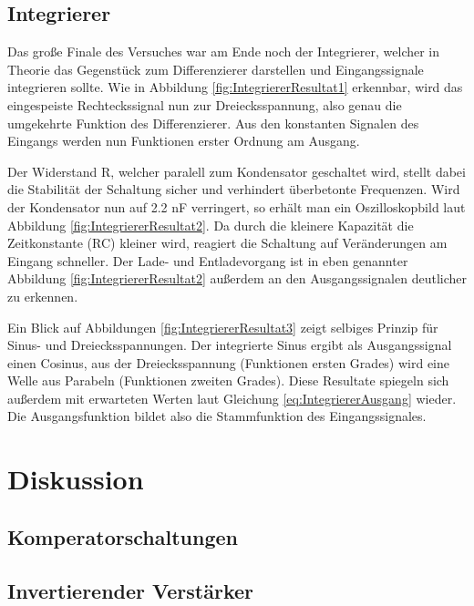 \documentclass[12pt,a4paper,twoside]{article}
\begin{document}
\subsection{Integrierer}

Das große Finale des Versuches war am Ende noch der Integrierer, welcher in Theorie das Gegenstück zum Differenzierer darstellen und Eingangssignale integrieren sollte. 
Wie in Abbildung \ref{fig:IntegriererResultat1} erkennbar, wird das eingespeiste Rechteckssignal nun zur Dreiecksspannung, also genau die umgekehrte Funktion des Differenzierer. Aus den konstanten Signalen des Eingangs werden nun Funktionen erster Ordnung am Ausgang. \newline

\noindent
Der Widerstand R, welcher paralell zum Kondensator geschaltet wird, stellt dabei die Stabilität der Schaltung sicher und verhindert überbetonte Frequenzen. Wird der Kondensator nun auf 2.2 nF verringert, so erhält man ein Oszilloskopbild laut Abbildung \ref{fig:IntegriererResultat2}.
Da durch die kleinere Kapazität die Zeitkonstante (RC) kleiner wird, reagiert die Schaltung auf Veränderungen am Eingang schneller. Der Lade- und Entladevorgang ist in eben genannter Abbildung \ref{fig:IntegriererResultat2} außerdem an den Ausgangssignalen deutlicher zu erkennen. \newline

\noindent
Ein Blick auf Abbildungen \ref{fig:IntegriererResultat3} zeigt selbiges Prinzip für Sinus- und Dreiecksspannungen. Der integrierte Sinus ergibt als Ausgangssignal einen Cosinus, aus der Dreiecksspannung (Funktionen ersten Grades) wird eine Welle aus Parabeln (Funktionen zweiten Grades).
Diese Resultate spiegeln sich außerdem mit erwarteten Werten laut Gleichung \ref{eq:IntegriererAusgang} wieder. Die Ausgangsfunktion bildet also die Stammfunktion des Eingangssignales.




\section{Diskussion} %

\subsection{Komperatorschaltungen}



\subsection{Invertierender Verstärker}
\end{document}
